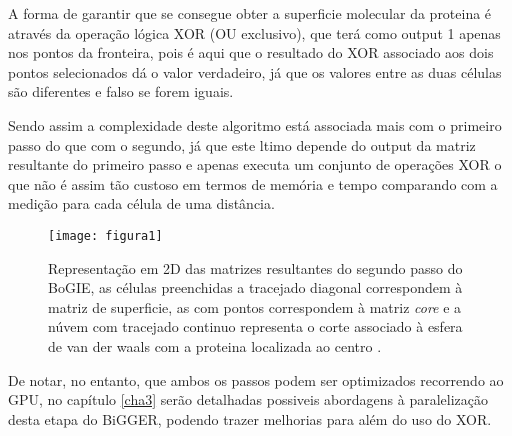  A forma de garantir que se consegue obter a superficie molecular da proteina é através da operação lógica XOR (OU exclusivo), que terá como output 1 apenas nos pontos da fronteira, pois é aqui que o resultado do XOR associado aos dois pontos selecionados dá o valor verdadeiro, já que os valores entre as duas células são diferentes e falso se forem iguais.
 
Sendo assim a complexidade deste algoritmo está associada mais com o primeiro passo do que com o segundo, já que este ltimo depende do output da matriz resultante do primeiro passo e apenas executa um conjunto de operações XOR o que não é assim tão custoso em termos de memória e tempo comparando com a medição para cada célula de uma distância.

\begin{figure}[ht]
  \centering
    {\texttt{[image: figura1]}}
  \caption{Representação em 2D das matrizes resultantes do segundo passo do BoGIE, as células preenchidas a tracejado diagonal correspondem à matriz de superficie, as com pontos correspondem à matriz \textit{core} e a núvem com tracejado continuo representa o corte associado à esfera de van der waals com a proteina localizada ao centro \cite{biggerPaper}.}
  \label{fig:fig2subfig}
\end{figure}

De notar, no entanto, que ambos os passos podem ser optimizados recorrendo ao GPU, no capítulo \ref{cha3} serão detalhadas possiveis abordagens à paralelização desta etapa do BiGGER, podendo trazer melhorias para além do uso do XOR.



